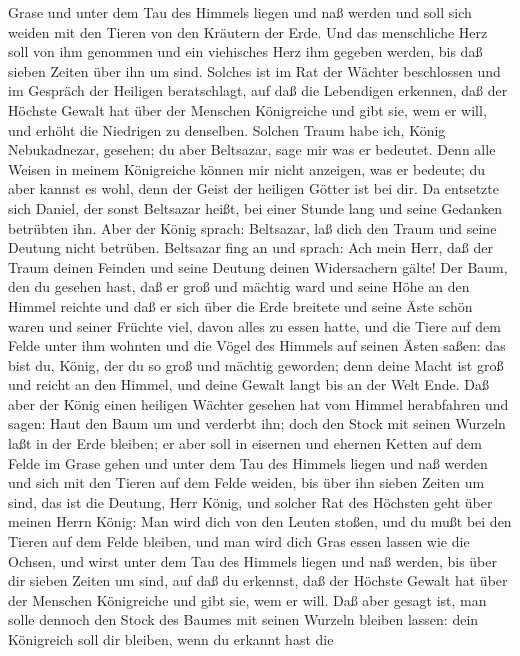 Grase und unter dem Tau des Himmels liegen und naß werden und soll sich
weiden mit den Tieren von den Kräutern der Erde.  Und das
menschliche Herz soll von ihm genommen und ein viehisches Herz ihm
gegeben werden, bis daß sieben Zeiten über ihn um sind. 
Solches ist im Rat der Wächter beschlossen und im Gespräch der Heiligen
beratschlagt, auf daß die Lebendigen erkennen, daß der Höchste Gewalt
hat über der Menschen Königreiche und gibt sie, wem er will, und erhöht
die Niedrigen zu denselben.  Solchen Traum habe ich, König
Nebukadnezar, gesehen; du aber Beltsazar, sage mir was er bedeutet. Denn
alle Weisen in meinem Königreiche können mir nicht anzeigen, was er
bedeute; du aber kannst es wohl, denn der Geist der heiligen Götter ist
bei dir.  Da entsetzte sich Daniel, der sonst Beltsazar
heißt, bei einer Stunde lang und seine Gedanken betrübten ihn. Aber der
König sprach: Beltsazar, laß dich den Traum und seine Deutung nicht
betrüben. Beltsazar fing an und sprach: Ach mein Herr, daß der Traum
deinen Feinden und seine Deutung deinen Widersachern gälte!
 Der Baum, den du gesehen hast, daß er groß und mächtig
ward und seine Höhe an den Himmel reichte und daß er sich über die Erde
breitete  und seine Äste schön waren und seiner Früchte
viel, davon alles zu essen hatte, und die Tiere auf dem Felde unter ihm
wohnten und die Vögel des Himmels auf seinen Ästen saßen: 
das bist du, König, der du so groß und mächtig geworden; denn deine
Macht ist groß und reicht an den Himmel, und deine Gewalt langt bis an
der Welt Ende.  Daß aber der König einen heiligen Wächter
gesehen hat vom Himmel herabfahren und sagen: Haut den Baum um und
verderbt ihn; doch den Stock mit seinen Wurzeln laßt in der Erde
bleiben; er aber soll in eisernen und ehernen Ketten auf dem Felde im
Grase gehen und unter dem Tau des Himmels liegen und naß werden und sich
mit den Tieren auf dem Felde weiden, bis über ihn sieben Zeiten um sind,
 das ist die Deutung, Herr König, und solcher Rat des
Höchsten geht über meinen Herrn König:  Man wird dich von
den Leuten stoßen, und du mußt bei den Tieren auf dem Felde bleiben, und
man wird dich Gras essen lassen wie die Ochsen, und wirst unter dem Tau
des Himmels liegen und naß werden, bis über dir sieben Zeiten um sind,
auf daß du erkennst, daß der Höchste Gewalt hat über der Menschen
Königreiche und gibt sie, wem er will.  Daß aber gesagt
ist, man solle dennoch den Stock des Baumes mit seinen Wurzeln bleiben
lassen: dein Königreich soll dir bleiben, wenn du erkannt hast die
